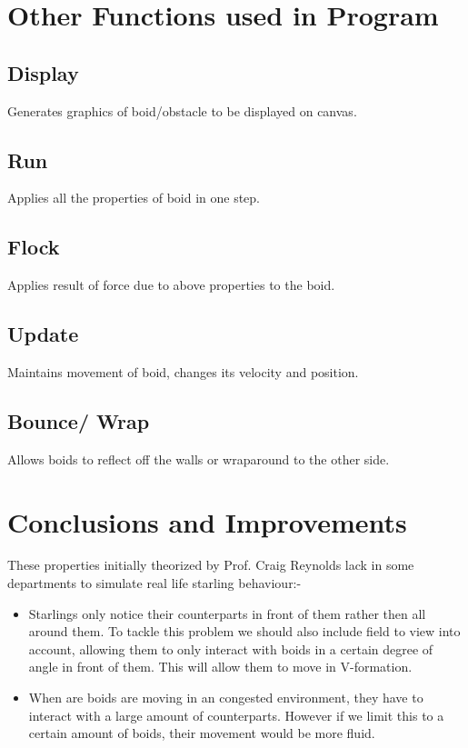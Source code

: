 \documentclass{article}
\begin{document}

\section{Other Functions used in Program}

\subsection{Display}
Generates graphics of boid/obstacle to be displayed on canvas.
\subsection{Run}
Applies all the properties of boid in one step.
\subsection{Flock}
Applies result of force due to above properties to the boid.
\subsection{Update}
Maintains movement of boid, changes its velocity and position.
\subsection{Bounce/ Wrap}
Allows boids to reflect off the walls or wraparound to the other side. 





\section{Conclusions and Improvements}
These properties initially theorized by Prof. Craig Reynolds lack in some departments to simulate real life starling behaviour:-

\begin{itemize}
    \item Starlings only notice their counterparts in front of them rather then all around them. To tackle this problem we should also include field to view into account, allowing them to only interact with boids in a certain degree of angle in front of them. This will allow them to move in V-formation.
    \item When are boids are moving in an congested environment, they have to interact with a large amount of counterparts. However if we limit this to a certain amount of boids, their movement would be more fluid.
\end{itemize}
\end{document}
